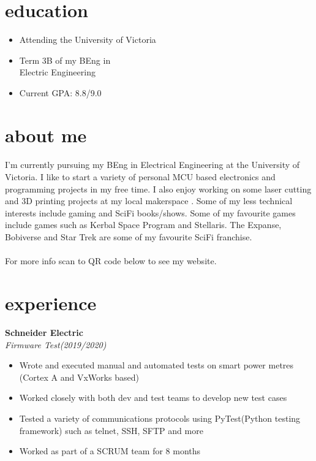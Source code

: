 \documentclass{article}
\newcommand{\minicolumns}[2]{
  \begin{minipage}[t]{0.25\textwidth}
    \begin{flushright}
      #1
    \end{flushright}
  \end{minipage}
  \hfill
  \begin{minipage}[t]{0.7\textwidth}
    #2
  \end{minipage}
}
\newcommand{\resumeSection}[3]{
  \minicolumns{
      \textbf{#1}\\
      \textit{#2}
    }
    {
      \begin{itemize}[leftmargin=*]
          \justifying
          \setlength\itemsep{-0.1em}
          #3
      \end{itemize}
  }
  \vspace{0.5\baselineskip}
}
\begin{document}
\begin{minipage}[t]{0.34\textwidth}
  \section{education}
  \begin{itemize}[leftmargin=*]
    \setlength\itemsep{-0.1em}
    \item Attending the University of Victoria
    \item Term 3B of my BEng in\\ Electric Engineering
    \item Current GPA: 8.8/9.0
  \end{itemize}

  \section{about me}
  \paragraph{}
  \raggedright
  I'm currently pursuing my BEng in Electrical Engineering at the University of Victoria. I like to start a variety of personal MCU based electronics and programming projects in my free time.  I also enjoy working on some laser cutting and 3D printing projects at my local makerspace . Some of my less technical interests include gaming and SciFi books/shows. Some of my favourite games include games such as Kerbal Space Program and Stellaris. The Expanse, Bobiverse and Star Trek are some of my favourite SciFi franchise.
  \paragraph{}
  For more info scan to QR code below to see my website.

  \vspace*{3em}
  \centering



\end{minipage}

\section{experience}
\resumeSection{Schneider Electric}{Firmware Test(2019/2020)}{
  \item Wrote and executed manual and automated tests on smart power metres (Cortex A and VxWorks based)
  \item Worked closely with both dev and test teams to develop new test cases
  \item Tested a variety of communications protocols using PyTest(Python testing framework) such as telnet, SSH, SFTP and more
  \item Worked as part of a SCRUM team for 8 months
}
\end{document}
